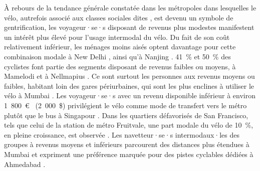\begin{refsegment}
À rebours de la tendance générale constatée dans les métropoles dans lesquelles le vélo, autrefois associé aux classes sociales dites , est devenu un symbole de gentrification, les voyageur·se·s disposant de revenus plus modestes manifestent un intérêt plus élevé pour l'usage intermodal du vélo. Du fait de son coût relativement inférieur, les ménages moins aisés optent davantage pour cette combinaison modale à New Delhi \textcolor{blue}{\autocite[6]{advani_bicycle_2006}}, ainsi qu'à Nanjing \textcolor{blue}{\autocite[]{chen_demand_2013, luan_better_2020}}. 41~\% et 50~\% des cyclistes font partie des segments disposant de revenus faibles ou moyens, à Mamelodi et à Nellmapius \textcolor{blue}{\autocite[35]{bechstein_cycling_2010}}. Ce sont surtout les personnes aux revenus moyens ou faibles, habitant loin des gares périurbaines, qui sont les plus enclines à utiliser le vélo à Mumbai \textcolor{blue}{\autocite[4]{rastogi_willingness_2010}}. Les voyageur·se·s avec un revenu disponible inférieur à environ 1~800~\euro~ (2~000~\$) privilégient le vélo comme mode de transfert vers le métro plutôt que le bus à Singapour \textcolor{blue}{\autocite[49]{meng_influence_2016}}. Dans les quartiers défavorisés de San Francisco, tels que celui de la station de métro Fruitvale, une part modale du vélo de 10~\%, en pleine croissance, est observée \textcolor{blue}{\autocite[90]{cervero_bike-and-ride_2013}}. Les navetteur·se·s intermodaux·les des groupes à revenus moyens et inférieurs parcourent des distances plus étendues à Mumbai \textcolor{blue}{\autocite[686]{rastogi_travel_2003}} et expriment une préférence marquée pour des pistes cyclables dédiées à Ahmedabad \textcolor{blue}{\autocite[40]{balya_integration_2016}}.%


\end{refsegment}
